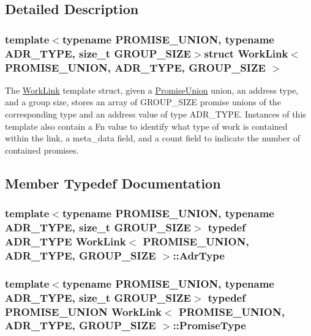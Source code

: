 \subsection{Detailed Description}
\subsubsection*{template$<$typename P\-R\-O\-M\-I\-S\-E\-\_\-\-U\-N\-I\-O\-N, typename A\-D\-R\-\_\-\-T\-Y\-P\-E, size\-\_\-t G\-R\-O\-U\-P\-\_\-\-S\-I\-Z\-E$>$struct Work\-Link$<$ P\-R\-O\-M\-I\-S\-E\-\_\-\-U\-N\-I\-O\-N, A\-D\-R\-\_\-\-T\-Y\-P\-E, G\-R\-O\-U\-P\-\_\-\-S\-I\-Z\-E $>$}

The {\ttfamily \hyperlink{structWorkLink}{Work\-Link}} template struct, given a {\ttfamily \hyperlink{unionPromiseUnion}{Promise\-Union}} union, an address type, and a group size, stores an array of {\ttfamily G\-R\-O\-U\-P\-\_\-\-S\-I\-Z\-E} promise unions of the corresponding type and an address value of type {\ttfamily A\-D\-R\-\_\-\-T\-Y\-P\-E}. Instances of this template also contain a {\ttfamily Fn} value to identify what type of work is contained within the link, a {\ttfamily meta\-\_\-data} field, and a {\ttfamily count} field to indicate the number of contained promises. 

\subsection{Member Typedef Documentation}
\hypertarget{structWorkLink_a62a19d1e475a79a2e21b751e4ee01f5c}{
\subsubsection[{Adr\-Type}]{\setlength{\rightskip}{0pt plus 5cm}template$<$typename P\-R\-O\-M\-I\-S\-E\-\_\-\-U\-N\-I\-O\-N, typename A\-D\-R\-\_\-\-T\-Y\-P\-E, size\-\_\-t G\-R\-O\-U\-P\-\_\-\-S\-I\-Z\-E$>$ typedef A\-D\-R\-\_\-\-T\-Y\-P\-E {\bf Work\-Link}$<$ P\-R\-O\-M\-I\-S\-E\-\_\-\-U\-N\-I\-O\-N, A\-D\-R\-\_\-\-T\-Y\-P\-E, G\-R\-O\-U\-P\-\_\-\-S\-I\-Z\-E $>$\-::{\bf Adr\-Type}}}\label{structWorkLink_a62a19d1e475a79a2e21b751e4ee01f5c}
\hypertarget{structWorkLink_ac1a9b55ec7f766327f5178b77fe9deeb}{
\subsubsection[{Promise\-Type}]{\setlength{\rightskip}{0pt plus 5cm}template$<$typename P\-R\-O\-M\-I\-S\-E\-\_\-\-U\-N\-I\-O\-N, typename A\-D\-R\-\_\-\-T\-Y\-P\-E, size\-\_\-t G\-R\-O\-U\-P\-\_\-\-S\-I\-Z\-E$>$ typedef P\-R\-O\-M\-I\-S\-E\-\_\-\-U\-N\-I\-O\-N {\bf Work\-Link}$<$ P\-R\-O\-M\-I\-S\-E\-\_\-\-U\-N\-I\-O\-N, A\-D\-R\-\_\-\-T\-Y\-P\-E, G\-R\-O\-U\-P\-\_\-\-S\-I\-Z\-E $>$\-::{\bf Promise\-Type}}}\label{structWorkLink_ac1a9b55ec7f766327f5178b77fe9deeb}


